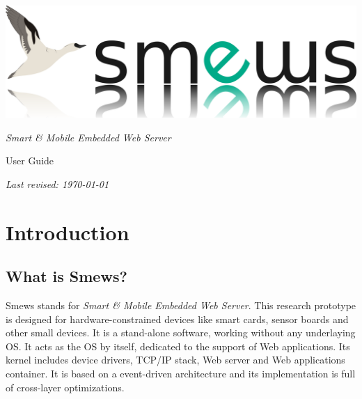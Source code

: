 \documentclass{report}
\begin{document}
\begin{titlepage}


~

\vspace{6cm}

\begin{center}
\includegraphics{smewsLogo}
\end{center}

\begin{center}
\LARGE
{\em Smart \& Mobile Embedded Web Server}

User Guide
\end{center}

\vfill

\begin{center}
\em
Last revised: \today
\end{center}

\end{titlepage}

\tableofcontents
 
\chapter{Introduction}

\section{What is Smews?}

Smews stands for \emph{Smart \& Mobile Embedded Web Server}. This research prototype is designed for hardware-constrained devices like smart cards, sensor boards and other small devices. It is a stand-alone software, working without any underlaying OS. It acts as the OS by itself, dedicated to the support of Web applications. Its kernel includes device drivers, TCP/IP stack, Web server and Web applications container. It is based on a event-driven architecture and its implementation is full of cross-layer optimizations.
\end{document}

